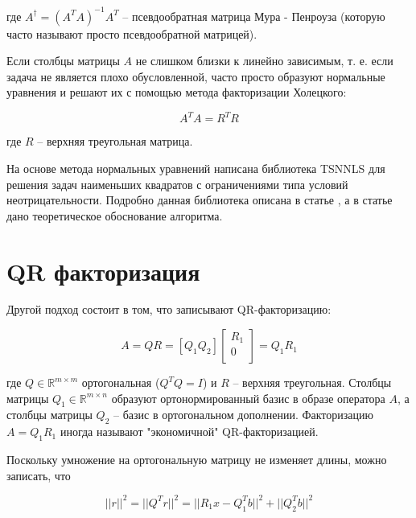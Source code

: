 \documentclass[a4paper, 12pt, titlepage]{article}
\theoremstyle{definition}
\theoremstyle{plain}
\theoremstyle{plain}
\begin{document}
где $A^{\dag} = (A^{T} A)^{-1} A^{T}$ -- псевдообратная матрица Мура - Пенроуза
(которую часто называют просто псевдообратной матрицей).

Если столбцы матрицы $A$ не слишком близки к линейно зависимым, т. е. если 
задача не является плохо обусловленной, часто просто образуют нормальные 
уравнения и решают их с помощью метода факторизации Холецкого:

\begin{equation}
 A^{T} A = R^{T} R
\end{equation}

где $R$ -- верхняя треугольная матрица.

На основе метода нормальных уравнений написана библиотека TSNNLS для решения
задач наименьших квадратов с ограничениями типа условий неотрицательности.
Подробно данная библиотека описана в статье \cite{CantarellaPiatek2004}, а в
статье \cite{Portugal1994} дано теоретическое обоснование алгоритма.

\section{QR факторизация}

Другой подход состоит в том, что записывают QR-факторизацию:

\begin{equation}
 A = Q R = [Q_{1} Q_{2}]\left[\begin{array}{c}
                               R_{1} \\
                               0 \\
                              \end{array}
\right] = Q_{1} R_{1}
\end{equation}

где $Q \in \mathbb{R}^{m \times m}$ ортогональная ($Q^{T} Q = I$) и $R$ --
верхняя треугольная. Столбцы матрицы $Q_{1} \in \mathbb{R}^{m \times n}$
образуют ортонормированный базис в образе оператора $A$, а столбцы матрицы 
$Q_{2}$ -- базис в ортогональном дополнении. Факторизацию
$A = Q_{1} R_{1}$ иногда называют "экономичной" QR-факторизацией.

Поскольку умножение на ортогональную матрицу не изменяет длины, можно записать,
что

\begin{equation}
 ||r||^{2} = ||Q^{T} r||^{2} =
 ||R_{1} x - Q_{1}^{T} b||^{2} + ||Q_{2}^{T} b||^{2}
\end{equation}
\end{document}
